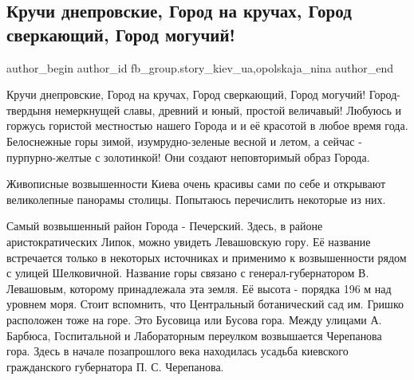 
 
 
 
 
 
\subsection{Кручи днепровские, Город на кручах, Город сверкающий, Город могучий!}
\label{sec:13_10_2021.fb.fb_group.story_kiev_ua.1.gorod_na_kruchah}
 
\ifcmt
 author_begin
   author_id fb_group.story_kiev_ua,opolskaja_nina
 author_end
\fi

Кручи днепровские, Город на кручах, Город сверкающий, Город могучий!
Город-твердыня немеркнущей славы, древний и юный, простой величавый!  Любуюсь и
горжусь гористой местностью нашего Города и и её красотой в любое время года.
Белоснежные горы зимой, изумрудно-зеленые весной и летом, а сейчас
- пурпурно-желтые с золотинкой! Они создают неповторимый образ Города. 





Живописные возвышенности Киева очень красивы сами по себе и открывают
великолепные панорамы столицы. Попытаюсь перечислить некоторые из них. 

Самый возвышенный район Города - Печерский. Здесь, в районе аристократических
Липок, можно увидеть Левашовскую гору. Её название встречается только в
некоторых источниках и применимо к возвышенности рядом с улицей Шелковичной.
Название горы связано с генерал-губернатором В. Левашовым, которому
принадлежала эта земля. Её высота - порядка 196 м над уровнем моря. Стоит
вспомнить, что Центральный ботанический сад им. Гришко расположен тоже на горе.
Это Бусовица или Бусова гора. Между улицами А. Барбюса, Госпитальной и
Лабораторным переулком возвышается Черепанова гора. Здесь в начале позапрошлого
века находилась усадьба киевского гражданского губернатора П. С. Черепанова. 

